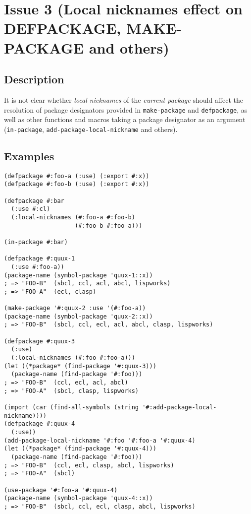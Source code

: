 \documentclass[11pt]{article}
\author{Grolter Bell}
\date{\today}
\title{}
\begin{document}
\section{Issue 3 (Local nicknames effect on DEFPACKAGE, MAKE-PACKAGE and others)}
\label{sec:org7a208f7}
\subsection{Description}
\label{sec:org7de4384}
It is not clear whether \emph{local nicknames} of the \emph{current package} should affect
the resolution of package designators provided in \texttt{make-package} and \texttt{defpackage},
as well as other functions and macros taking a package designator as an argument
(\texttt{in-package}, \texttt{add-package-local-nickname} and others).
\subsection{Examples}
\label{sec:org9af8527}
\begin{verbatim}
(defpackage #:foo-a (:use) (:export #:x))
(defpackage #:foo-b (:use) (:export #:x))

(defpackage #:bar
  (:use #:cl)
  (:local-nicknames (#:foo-a #:foo-b)
                    (#:foo-b #:foo-a)))

(in-package #:bar)

(defpackage #:quux-1
  (:use #:foo-a))
(package-name (symbol-package 'quux-1::x))
; => "FOO-B"  (sbcl, ccl, acl, abcl, lispworks)
; => "FOO-A"  (ecl, clasp)

(make-package '#:quux-2 :use '(#:foo-a))
(package-name (symbol-package 'quux-2::x))
; => "FOO-B"  (sbcl, ccl, ecl, acl, abcl, clasp, lispworks)

(defpackage #:quux-3
  (:use)
  (:local-nicknames (#:foo #:foo-a)))
(let ((*package* (find-package '#:quux-3)))
  (package-name (find-package '#:foo)))
; => "FOO-B"  (ccl, ecl, acl, abcl)
; => "FOO-A"  (sbcl, clasp, lispworks)

(import (car (find-all-symbols (string '#:add-package-local-nickname))))
(defpackage #:quux-4
  (:use))
(add-package-local-nickname '#:foo '#:foo-a '#:quux-4)
(let ((*package* (find-package '#:quux-4)))
  (package-name (find-package '#:foo)))
; => "FOO-B"  (ccl, ecl, clasp, abcl, lispworks)
; => "FOO-A"  (sbcl)

(use-package '#:foo-a '#:quux-4)
(package-name (symbol-package 'quux-4::x))
; => "FOO-B"  (sbcl, ccl, ecl, clasp, abcl, lispworks)
\end{verbatim}
\end{document}
